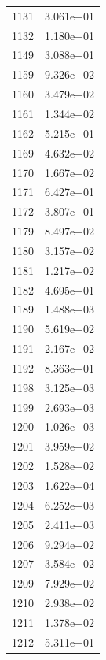 \documentclass[12pt]{article}
\begin{document}
\begin{longtable}{@{}cc@{}}
1131 & 3.061e+01 \\
1132 & 1.180e+01 \\
1149 & 3.088e+01 \\
1159 & 9.326e+02 \\
1160 & 3.479e+02 \\
1161 & 1.344e+02 \\
1162 & 5.215e+01 \\
1169 & 4.632e+02 \\
1170 & 1.667e+02 \\
1171 & 6.427e+01 \\
1172 & 3.807e+01 \\
1179 & 8.497e+02 \\
1180 & 3.157e+02 \\
1181 & 1.217e+02 \\
1182 & 4.695e+01 \\
1189 & 1.488e+03 \\
1190 & 5.619e+02 \\
1191 & 2.167e+02 \\
1192 & 8.363e+01 \\
1198 & 3.125e+03 \\
1199 & 2.693e+03 \\
1200 & 1.026e+03 \\
1201 & 3.959e+02 \\
1202 & 1.528e+02 \\
1203 & 1.622e+04 \\
1204 & 6.252e+03 \\
1205 & 2.411e+03 \\
1206 & 9.294e+02 \\
1207 & 3.584e+02 \\
1209 & 7.929e+02 \\
1210 & 2.938e+02 \\
1211 & 1.378e+02 \\
1212 & 5.311e+01 \\

\bottomrule
\end{longtable}
\end{document}
